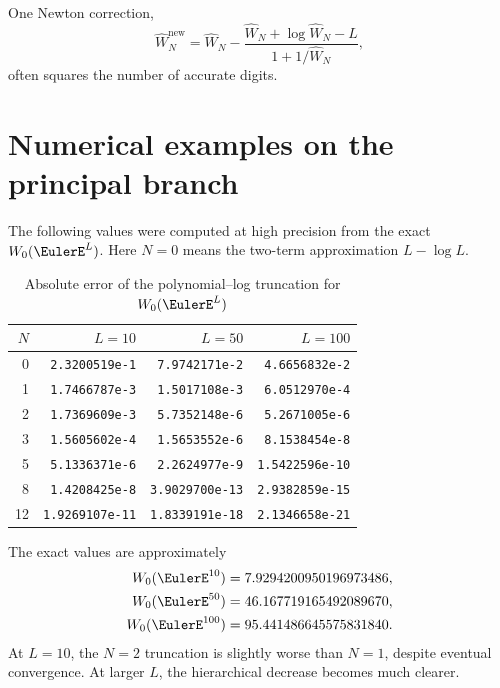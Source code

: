 \documentclass[11pt,openany]{book}
\theoremstyle{definition}
\theoremstyle{plain}
\theoremstyle{remark}
\newcommand{\LambertAsymptoticApproximation}[1]{\widehat{W}_{#1}}
\begin{document}
One Newton correction,
\begin{equation}\label{eq:W-one-Newton}
 \LambertAsymptoticApproximation{N}^{\mathrm{new}}
 =\LambertAsymptoticApproximation{N}-
 \frac{\LambertAsymptoticApproximation{N}+\log\LambertAsymptoticApproximation{N}-L}
 {1+1/\LambertAsymptoticApproximation{N}},
\end{equation}
often squares the number of accurate digits.

\section{Numerical examples on the principal branch}
The following values were computed at high precision from the exact \(W_0(\EulerE^L)\). Here \(N=0\) means the two-term approximation \(L-\log L\).

\begin{table}[htbp]
\centering
\caption{Absolute error of the polynomial--log truncation for \(W_0(\EulerE^L)\)}\label{tab:W-errors}
\footnotesize
\begin{tabular}{@{}r@{\qquad}r@{\qquad}r@{\qquad}r@{}}
\toprule
\(N\) & \(L=10\) & \(L=50\) & \(L=100\)\\
\midrule
0  & \texttt{2.3200519e-1}  & \texttt{7.9742171e-2}  & \texttt{4.6656832e-2}\\
1  & \texttt{1.7466787e-3}  & \texttt{1.5017108e-3}  & \texttt{6.0512970e-4}\\
2  & \texttt{1.7369609e-3}  & \texttt{5.7352148e-6}  & \texttt{5.2671005e-6}\\
3  & \texttt{1.5605602e-4}  & \texttt{1.5653552e-6}  & \texttt{8.1538454e-8}\\
5  & \texttt{5.1336371e-6}  & \texttt{2.2624977e-9}  & \texttt{1.5422596e-10}\\
8  & \texttt{1.4208425e-8}  & \texttt{3.9029700e-13} & \texttt{2.9382859e-15}\\
12 & \texttt{1.9269107e-11} & \texttt{1.8339191e-18} & \texttt{2.1346658e-21}\\
\bottomrule
\end{tabular}
\end{table}

The exact values are approximately
\begin{align*}
 W_0(\EulerE^{10})&=7.9294200950196973486,\\
 W_0(\EulerE^{50})&=46.167719165492089670,\\
 W_0(\EulerE^{100})&=95.441486645575831840.
\end{align*}
At \(L=10\), the \(N=2\) truncation is slightly worse than \(N=1\), despite eventual convergence. At larger \(L\), the hierarchical decrease becomes much clearer.
\end{document}
